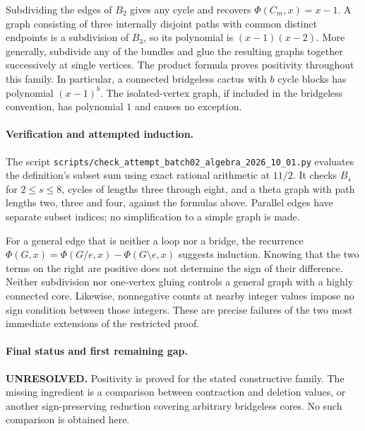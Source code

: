 \documentclass[11pt,a4paper]{article}
\begin{document}
Subdividing the edges of $B_2$ gives any cycle and recovers
$\Phi(C_m,x)=x-1$. A graph consisting of three internally disjoint
paths with common distinct endpoints is a subdivision of $B_3$, so
its polynomial is $(x-1)(x-2)$. More generally, subdivide any of the
bundles and glue the resulting graphs together successively at single
vertices. The product formula proves positivity throughout this family.
In particular, a connected bridgeless cactus with $b$ cycle blocks has
polynomial $(x-1)^b$. The isolated-vertex graph, if included in the
bridgeless convention, has polynomial $1$ and causes no exception.

\paragraph{Verification and attempted induction.}
The script \texttt{scripts/check\_attempt\_batch02\_algebra\_2026\_10\_01.py}
evaluates the definition's subset sum using exact rational arithmetic
at $11/2$. It checks $B_s$ for $2\le s\le8$, cycles of lengths three
through eight, and a theta graph with path lengths two, three and four,
against the formulas above. Parallel edges have separate subset indices;
no simplification to a simple graph is made.

For a general edge that is neither a loop nor a bridge, the recurrence
$\Phi(G,x)=\Phi(G/e,x)-\Phi(G\setminus e,x)$ suggests induction.
Knowing that the two terms on the right are positive does not determine
the sign of their difference. Neither subdivision nor one-vertex gluing
controls a general graph with a highly connected core. Likewise,
nonnegative counts at nearby integer values impose no sign condition
between those integers. These are precise failures of the two most
immediate extensions of the restricted proof.

\paragraph{Final status and first remaining gap.}
\textbf{UNRESOLVED.} Positivity is proved for the stated constructive
family. The missing ingredient is a comparison between contraction and
deletion values, or another sign-preserving reduction covering arbitrary
bridgeless cores. No such comparison is obtained here.
\end{document}
